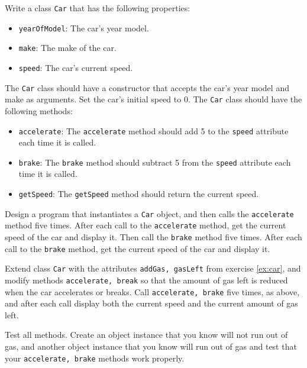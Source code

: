 Write a class \lstinline{Car} that has the following properties:
  \begin{itemize}
  \item \lstinline{yearOfModel}: The car's year model.
  \item \lstinline{make}: The make of the car.
  \item \lstinline{speed}: The car's current speed.
  \end{itemize}
  The \lstinline{Car} class should have a constructor that accepts the car's year model and make as arguments. Set the car's initial speed to 0.  The \lstinline{Car} class should have the following methods:
  \begin{itemize}
  \item \lstinline{accelerate}: The \lstinline{accelerate} method should add 5 to the \lstinline{speed} attribute each time it is called.
  \item \lstinline{brake}: The \lstinline{brake} method should subtract 5 from the \lstinline{speed} attribute each time it is called.
  \item \lstinline{getSpeed}: The \lstinline{getSpeed} method should return the current speed.
  \end{itemize}
  Design a program that instantiates a \lstinline{Car} object, and then calls the \lstinline{accelerate} method five times. After each call to the \lstinline{accelerate} method, get the current speed of the car and display it. Then call the \lstinline{brake} method five times. After each call to the \lstinline{brake} method, get the current speed of the car and display it.
  
  Extend class \lstinline{Car} with the attributes \lstinline{addGas, gasLeft} from exercise \ref{ex:car}, and modify methods \lstinline{accelerate, break} so that the amount of gas left is reduced when the car accelerates or breaks. Call \lstinline{accelerate, brake} five times, as above, and after each call display both the current speed and the current amount of gas left.
  
  Test all methods. Create an object instance that you know will not run out of gas, and another object instance that you know will run out of gas and test that your \lstinline{accelerate, brake} methods work properly.
  